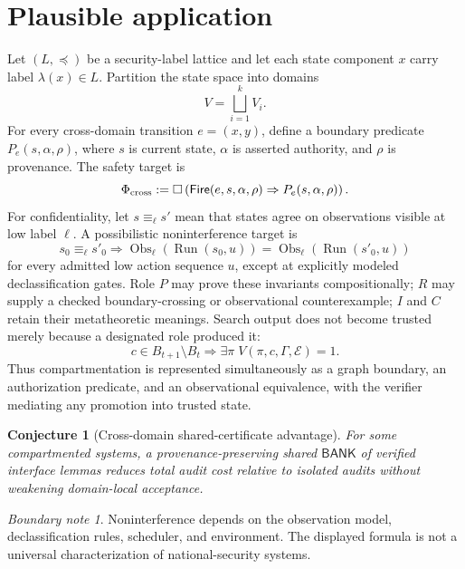 \documentclass[11pt,oneside]{book}
\newtheorem{conjecture}[theorem]{Conjecture}
\theoremstyle{definition}
\theoremstyle{remark}
\newtheorem{boundary}[theorem]{Boundary note}
\newcommand{\BANK}{\mathsf{BANK}}
\newcommand{\Fire}{\mathsf{Fire}}
\begin{document}
\section{Plausible application}
Let \((L,\preceq)\) be a security-label lattice and let each state component \(x\) carry label
\(\lambda(x)\in L\). Partition the state space into domains
\[
V=\bigsqcup_{i=1}^{k}V_i.
\]
For every cross-domain transition \(e=(x,y)\), define a boundary predicate
\(P_e(s,\alpha,\rho)\), where \(s\) is current state, \(\alpha\) is asserted authority, and \(\rho\)
is provenance. The safety target is
\[
\Phi_{\rm cross}:=
\Box\left(
\Fire(e,s,\alpha,\rho)
\Rightarrow P_e(s,\alpha,\rho)
\right).
\]
For confidentiality, let \(s\equiv_\ell s'\) mean that states agree on observations visible at low
label \(\ell\). A possibilistic noninterference target is
\[
s_0\equiv_\ell s'_0
\Longrightarrow
\operatorname{Obs}_\ell(\operatorname{Run}(s_0,u))
=\operatorname{Obs}_\ell(\operatorname{Run}(s'_0,u))
\]
for every admitted low action sequence \(u\), except at explicitly modeled declassification gates.
Role \(P\) may prove these invariants compositionally; \(R\) may supply a checked boundary-crossing
or observational counterexample; \(I\) and \(C\) retain their metatheoretic meanings. Search output
does not become trusted merely because a designated role produced it:
\[
c\in B_{t+1}\setminus B_t
\Longrightarrow
\exists\pi\;V(\pi,c,\Gamma,\mathcal E)=1.
\]
Thus compartmentation is represented simultaneously as a graph boundary, an authorization
predicate, and an observational equivalence, with the verifier mediating any promotion into trusted
state.

\begin{conjecture}[Cross-domain shared-certificate advantage]
For some compartmented systems, a provenance-preserving shared \(\BANK\) of verified interface
lemmas reduces total audit cost relative to isolated audits without weakening domain-local acceptance.
\end{conjecture}

\begin{boundary}
Noninterference depends on the observation model, declassification rules, scheduler, and environment.
The displayed formula is not a universal characterization of national-security systems.
\end{boundary}
\end{document}
